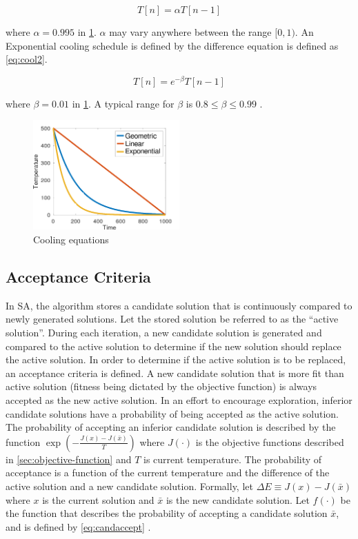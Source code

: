 \documentclass[11pt,a4paper,final]{article}
\newcommand{\Tau}{T}                        %
\begin{document}
\begin{equation}
\label{eq:cool1}
\Tau[n] = \alpha \Tau[n-1]
\end{equation}

where \(\alpha = 0.995\) in \ref{fig:cool}. \(\alpha\) may vary anywhere between the range \([0,1)\). An Exponential cooling schedule is
defined by the difference equation is defined as \ref{eq:cool2}.

\begin{equation}
\label{eq:cool2}
\Tau[n] = e^{-\beta}\Tau[n-1]
\end{equation}

where \(\beta = 0.01\) in \ref{fig:cool}. A typical range for \(\beta\) is \(0.8 \le \beta \le 0.99\) \cite{delahaye-2019-simul}.

\begin{figure}[htbp]
\centering
\includegraphics[width=0.5\textwidth]{sections/img/cool_func.png}
\caption{\label{fig:cool}Cooling equations}
\end{figure}

\subsection{Acceptance Criteria}
\label{sec:acceptance}
In SA, the algorithm stores a candidate solution that is continuously compared to newly generated solutions. Let the
stored solution be referred to as the ``active solution''. During each iteration, a new candidate solution is generated
and compared to the active solution to determine if the new solution should replace the active solution. In order to
determine if the active solution is to be replaced, an acceptance criteria is defined. A new candidate solution that is
more fit than active solution (fitness being dictated by the objective function) is always accepted as the new active
solution. In an effort to encourage exploration, inferior candidate solutions have a probability of being accepted as
the active solution. The probability of accepting an inferior candidate solution is described by the function
\(\exp(-\frac{J(x) - J(\bar{x})}{\Tau})\) where \(J(\cdot)\) is the objective functions described in \ref{sec:objective-function} and
\(\Tau\) is current temperature. The probability of acceptance is a function of the current temperature and the difference
of the active solution and a new candidate solution. Formally, let \(\Delta E \equiv J(x) - J(\bar{x})\) where \(x\) is the current
solution and \(\bar{x}\) is the new candidate solution. Let \(f(\cdot)\) be the function that describes the probability of
accepting a candidate solution \(\bar{x}\), and is defined by \ref{eq:candaccept} \cite{keller-2019-multi-objec}.
\end{document}
